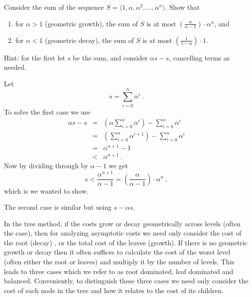 \begin{flex}
\label{grp:xrcs:analysis::recurrences::sums-of-geometric-series}

\begin{exercise}
\label{xrcs:analysis::recurrences::sums-of-geometric-series}
  Consider the sum of the sequence $S = \langle 1, \alpha, \alpha^2,
  \ldots, \alpha^n \rangle$.   Show that
\begin{enumerate}
\item
 for $\alpha > 1$ (geometric growth), the sum of $S$ is at most
  $\left(\frac{\alpha}{\alpha -1}\right) \cdot \alpha^n$, and 
\item
for $\alpha < 1$ (geometric decay), the
  sum of $S$ is at most  $\left(\frac{1}{1 - \alpha}\right) \cdot 1$.
\end{enumerate}
Hint: for the first let $s$ be the sum, and consider $\alpha s - s$, cancelling
terms as needed.

\end{exercise}

\begin{solution}
\label{sol:analysis::recurrences::solve}
Let
\[s = \sum_{i=0}^n \alpha^i~.\]
To solve the first case we use
\[ 
\begin{array}{lcl}
\alpha s - s & = & \left(\alpha \sum_{i=0}^n \alpha^i\right) -
                   \sum_{i=0}^n \alpha^i\\
                  & = & \left(\sum_{i=0}^n \alpha^{i+1}\right) -
                        \sum_{i=0}^n \alpha^i\\
                  & = & \alpha^{n+1} - 1\\
                  & < & \alpha^{n+1} ~.
\end{array}
\]
Now by dividing through by $\alpha - 1$ we get
\[ s < \frac{\alpha^{n+1}}{\alpha-1} = \left(\frac{\alpha}{\alpha-1}\right)
  \cdot \alpha^n~, \]
which is we wanted to show.

The second case is similar but using $s - \alpha s$.

\end{solution}
\end{flex}

\begin{cluster}
\label{grp:grm:analysis::recurrences::tree}

\begin{gram}
\label{grm:analysis::recurrences::tree}
  In the tree method, if the costs grow or decay geometrically across
  levels (often the case), then for analyzing asymptotic costs we need only consider the
  cost of the root (decay) , or the total cost of the leaves (growth).
  If there is no geometric growth or decay then it often suffices to
  calculate the cost of the worst level (often either the root or
  leaves) and multiply it by the number of levels.
  This leads to three cases which we refer to as root dominated, leaf 
  dominated and balanced.   
  Conveniently, to distinguish these three cases 
  we need only consider the cost of each node in the 
  tree and how it relates to the cost of its children.

\end{gram}
\end{cluster}

